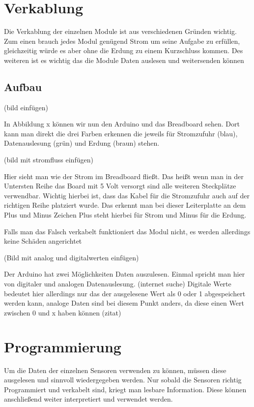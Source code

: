 \def \currentAuthor {Kevin Glatz}
\newpage


\section{Verkablung}

Die Verkablung der einzelnen Module ist aus verschiedenen Gründen wichtig. Zum einen brauch jedes Modul genügend Strom um seine Aufgabe zu erfüllen, gleichzeitig würde es aber ohne die Erdung zu einem Kurzschluss kommen. Des weiteren ist es wichtig das die Module Daten auslesen und weitersenden können

\subsection{Aufbau}

(bild einfügen)

In Abbildung x können wir nun den Arduino und das Breadboard sehen.  Dort kann man direkt die drei Farben erkennen die jeweils für Stromzufuhr (blau), Datenauslesung (grün) und Erdung (braun) stehen.

(bild mit stromfluss einfügen)

Hier sieht man wie der Strom im Breadboard fließt. Das heißt wenn man in der Untersten Reihe das Board mit 5 Volt versorgt sind alle weiteren Steckplätze verwendbar. Wichtig hierbei ist, dass das Kabel für die Stromzufuhr auch auf der richtigen Reihe platziert wurde. Das erkennt man bei dieser Leiterplatte an dem Plus und Minus Zeichen Plus steht hierbei für Strom und Minus für die Erdung.

Falls man das Falsch verkabelt funktioniert das Modul nicht, es werden allerdings keine Schäden angerichtet


(Bild mit analog und digitalwerten einfügen)

Der Arduino hat zwei Möglichkeiten Daten auszulesen. Einmal spricht man hier von digitaler und analogen Datenauslesung. (internet suche) Digitale Werte bedeutet hier allerdings nur das der ausgelesene Wert als 0 oder 1 abgespeichert werden kann, analoge Daten sind bei diesem Punkt anders, da diese einen Wert zwischen 0 und x haben können (zitat)

\section{Programmierung}

Um die Daten der einzelnen Sensoren verwenden zu können, müssen diese ausgelesen und sinnvoll wiedergegeben werden. Nur sobald die Sensoren richtig Programmiert und verkabelt sind, kriegt man lesbare Information. Diese können anschließend weiter interpretiert und verwendet werden. 

